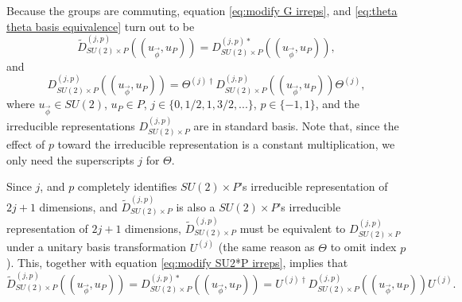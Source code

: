 \documentclass[preprint, 12pt]{revtex4-2}
\numberwithin{equation}{section}
\begin{document}
Because the groups are commuting, equation \ref{eq:modify G irreps}, and \ref{eq:theta theta basis equivalence} turn out to be
\begin{equation}\label{eq:modify SU2*P irreps}
    \tilde{D}_{SU(2)\times P}^{(j,p)}((u_{\vec{\phi}}, u_P)) = D_{SU(2)\times P}^{(j,p)\ast}((u_{\vec{\phi}}, u_P)),
\end{equation}
and
\begin{equation}\label{eq:theta theta SU2*P basis equivalence}
   D_{SU(2)\times P}^{(j,p)}((u_{\vec{\phi}}, u_P)) = \Theta^{(j)\dagger} D_{SU(2)\times P}^{(j,p)}((u_{\vec{\phi}}, u_P))\Theta^{(j)},
\end{equation}
where $u_{\vec{\phi}}\in SU(2)$, $u_P\in P$, $j\in \{0, 1/2, 1, 3/2, ...\}$, $p\in\{-1, 1\}$, and the irreducible representations $D_{SU(2)\times P}^{(j,p)}$ are in standard basis. Note that, since the effect of $p$ toward the irreducible representation is a constant multiplication, we only need the superscripts $j$ for $\Theta$.

Since $j$, and $p$ completely identifies $SU(2)\times P$'s irreducible representation of $2j+1$ dimensions, and $\tilde{D}_{SU(2)\times P}^{(j,p)}$ is also a $SU(2)\times P$'s irreducible representation of $2j+1$ dimensions, $\tilde{D}_{SU(2)\times P}^{(j,p)}$ must be equivalent to $D_{SU(2)\times P}^{(j,p)}$ under a unitary basis transformation $U^{(j)}$ (the same reason as $\Theta$ to omit index $p$). This, together with equation \ref{eq:modify SU2*P irreps}, implies that
\begin{equation}\label{eq:theta SU2*P basis equivalence}
    \tilde{D}_{SU(2)\times P}^{(j,p)}((u_{\vec{\phi}}, u_P)) = D_{SU(2)\times P}^{(j,p)\ast}((u_{\vec{\phi}}, u_P))=U^{(j)\dagger} D_{SU(2)\times P}^{(j,p)}((u_{\vec{\phi}}, u_P))U^{(j)}.
\end{equation}
\end{document}
